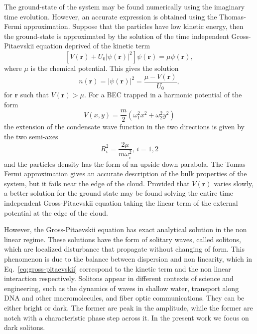 The ground-state of the system may be found numerically using the imaginary time evolution. However, an accurate expression is obtained using the Thomas-Fermi approximation. Suppose that the particles have low kinetic energy, then the ground-state is approximated by the solution of the time independent Gross-Pitaevskii equation deprived of the kinetic term
\begin{equation}
\left[ V(\textbf{r}) + U_0 |\psi(\textbf{r})|^2 \right] \psi(\textbf{r}) = \mu \psi(\textbf{r}),
\end{equation}
where $\mu$ is the chemical potential. This gives the solution
\begin{equation}
n(\textbf{r}) = |\psi(\textbf{r})|^2 = \frac{\mu - V(\textbf{r})}{U_0},
\end{equation}
for $\textbf{r}$ such that $V(\textbf{r}) > \mu$. 
For a BEC trapped in a harmonic potential of the form
\begin{equation}
V(x,y) = \frac{m}{2} (\omega_1^2 x^2 + \omega_2^2 y^2)
\end{equation}
the extension of the condensate wave function in the two directions is given by the two semi-axes
\begin{equation}
R_i^2 = \frac{2\mu}{m\omega_i^2}, \, i = 1,2
\end{equation}
and the particles density has the form of an upside down parabola. The Tomas-Fermi approximation gives an accurate description of the bulk properties of the system, but it fails near the edge of the cloud. Provided that $V(\textbf{r})$ varies slowly, a better solution for the ground state may be found solving the entire time independent Gross-Pitaevskii equation taking the linear term of the external potential at the edge of the cloud.

However, the Gross-Pitaevskii equation has exact analytical solution in the non linear regime. These solutions have the form of solitary waves, called solitons, which are localized disturbance that propagate without changing of form. This phenomenon is due to the balance between dispersion and non linearity, which in Eq.~\eqref{eq:gross-pitaevskii} correspond to the kinetic term and the non linear interaction respectively. Solitons appear in different contexts of science and engineering, such as the dynamics of waves in shallow water,
transport along DNA and other macromolecules,
and fiber optic communications.
They can be either bright or dark. The former are peak in the amplitude, while the former are notch with a characteristic phase step across it. In the present work we focus on dark solitons. 

